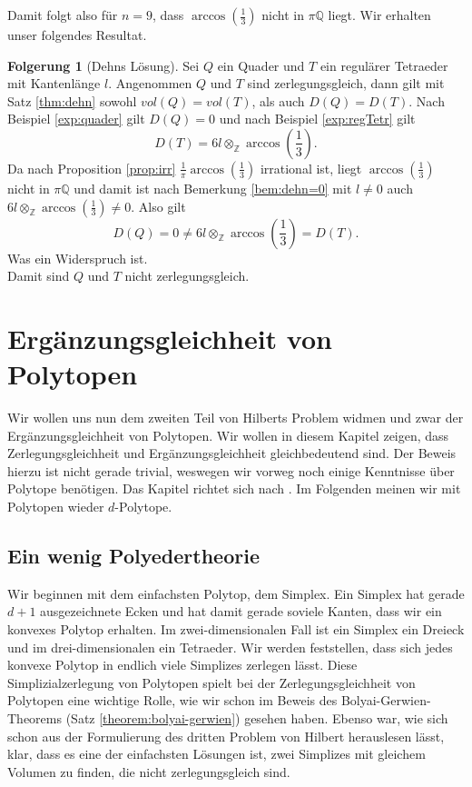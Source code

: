 \documentclass[11pt,titlepage]{article}
\newcommand{\setZ}{\mathbb{Z}}
\newcommand{\setQ}{\mathbb{Q}}
\theoremstyle{definition}
\newtheorem{corollary}[theorem]{Folgerung}
\theoremstyle{remark}
\begin{document}
	Damit folgt also für $n=9$, dass $\arccos\left(\frac{1}{3}\right)$ nicht in $\pi\setQ$ liegt. Wir erhalten unser 
	folgendes Resultat.
	
	\begin{corollary}[Dehns Lösung]
		Sei $Q$ ein Quader und $T$ ein regulärer Tetraeder mit Kantenlänge $l$. Angenommen 
		$Q$ und $T$ sind zerlegungsgleich, dann gilt mit Satz \ref{thm:dehn} sowohl $vol(Q)=vol(T)$, als auch 
		$D(Q)=D(T)$. 
		Nach Beispiel \ref{exp:quader} gilt $D(Q)=0$ und nach Beispiel \ref{exp:regTetr} gilt
		\[D(T)=6l\otimes_{\setZ}\arccos\left(\frac{1}{3}\right).\]
		Da nach Proposition \ref{prop:irr} $\frac{1}{\pi}\arccos\left(\frac{1}{3}\right)$ irrational ist, liegt
		$\arccos\left(\frac{1}{3}\right)$ nicht in $\pi\setQ$ und damit ist nach Bemerkung \ref{bem:dehn=0} 
		mit $l\neq 0$ auch $6l\otimes_{\setZ}\arccos\left(\frac{1}{3}\right)\neq 0$. Also gilt
		\[ D(Q)=0\neq 6l\otimes_{\setZ}\arccos\left(\frac{1}{3}\right)=D(T).\]
		Was ein Widerspruch ist. \\
		Damit sind $Q$ und $T$ nicht zerlegungsgleich.
	\end{corollary}	
	
	\newpage
	
	\section{Ergänzungsgleichheit von Polytopen}
	
	Wir wollen uns nun dem zweiten Teil von Hilberts Problem widmen und zwar der 
	Ergänzungsgleichheit von Polytopen. Wir wollen in diesem Kapitel zeigen, dass 
	Zerlegungsgleichheit und Ergänzungsgleichheit gleichbedeutend sind. Der 
	Beweis hierzu ist nicht gerade trivial, weswegen wir vorweg noch einige 
	Kenntnisse über Polytope benötigen. Das Kapitel richtet sich nach 
	\cite{Hadwiger}. 
	Im Folgenden meinen wir mit Polytopen wieder $d$-Polytope. 
	
	\subsection{Ein wenig Polyedertheorie}
	
	Wir beginnen mit dem einfachsten Polytop, dem Simplex. Ein Simplex hat 
	gerade $d+1$ ausgezeichnete Ecken und hat damit gerade soviele Kanten, dass 
	wir ein konvexes Polytop erhalten. Im zwei-dimensionalen Fall ist ein 
	Simplex ein Dreieck und im drei-dimensionalen ein Tetraeder. Wir werden 
	feststellen, dass sich jedes konvexe Polytop in endlich viele Simplizes 
	zerlegen lässt. Diese Simplizialzerlegung von Polytopen spielt bei 
	der Zerlegungsgleichheit von Polytopen eine wichtige Rolle, wie wir schon im 
	Beweis des Bolyai-Gerwien-Theorems (Satz \ref{theorem:bolyai-gerwien}) 
	gesehen haben. Ebenso war, wie sich schon aus der Formulierung des dritten Problem von Hilbert herauslesen lässt, klar, dass es eine der einfachsten Lösungen ist, zwei Simplizes mit gleichem Volumen zu finden, die nicht zerlegungsgleich sind.
	
\end{document}
